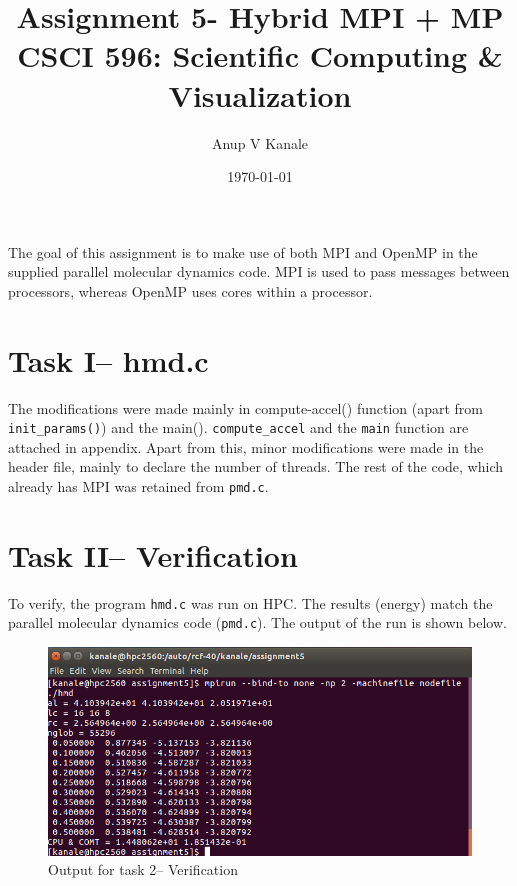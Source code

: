 \documentclass[11pt, oneside]{article}   	%
\title{\vspace{-6ex} Assignment 5- Hybrid MPI + MP \\ {CSCI 596: Scientific Computing \& Visualization}  \vspace{-2ex}}
\author{Anup V Kanale}
\date{\vspace{-2ex}\today}							%
\begin{document}
\maketitle \vspace{-5ex}

The goal of this assignment is to make use of both MPI and OpenMP in the supplied parallel molecular dynamics code. MPI is used to pass messages between processors, whereas OpenMP uses cores within a processor. 
\vspace{-2ex}
\section{Task I-- hmd.c \vspace{-2ex}}
The modifications were made mainly in compute-accel() function (apart from \texttt{init\_params()}) and the main(). \texttt{compute\_accel} and the \texttt{main} function are attached in appendix. Apart from this, minor modifications were made in the header file, mainly to declare the number of threads. The rest of the code, which already has MPI was retained from \texttt{pmd.c}.
\vspace{-2ex}
\section{Task II-- Verification \vspace{-2ex}}
To verify, the program \texttt{hmd.c} was run on HPC. The results (energy) match the parallel molecular dynamics code (\texttt{pmd.c}). The output of the run is shown below.
\begin{figure}[!htbp]
	\centering
	\includegraphics[scale=0.6]{output2.png}
 	\caption{Output for task 2-- Verification}
\end{figure}
\end{document}
